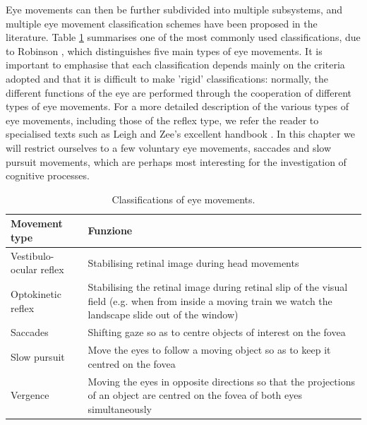 \documentclass[11pt]{article}
\begin{document}
Eye movements can then be further subdivided into multiple subsystems, and multiple eye movement classification schemes have been proposed in the literature. Table \ref{tab1} summarises one of the most commonly used classifications, due to Robinson \cite{Robinson1968}, which distinguishes five main types of eye movements. It is important to emphasise that each classification depends mainly on the criteria adopted and that it is difficult to make 'rigid' classifications: normally, the different functions of the eye are performed through the cooperation of different types of eye movements. For a more detailed description of the various types of eye movements, including those of the reflex type, we refer the reader to specialised texts such as Leigh and Zee's excellent handbook \cite{Leigh2015}. In this chapter we will restrict ourselves to a few voluntary eye movements, saccades and slow pursuit movements, which are perhaps most interesting for the investigation of cognitive processes.

\begin{table}
\centering
\caption{Classifications of eye movements.} \label{tab1}
\begin{tabular}{p{5.3cm}p{8cm}}
  \hline
\textbf{Movement type}  & \textbf{Funzione}\\
  \hline  \hline
Vestibulo-ocular reflex & Stabilising retinal image during head movements \\  \hline
 Optokinetic reflex & Stabilising the retinal image during retinal slip of the visual field (e.g. when from inside a moving train we watch the landscape slide out of the window)  \\  \hline
  Saccades & Shifting gaze so as to centre objects of interest on the fovea  \\  \hline
  Slow pursuit & Move the eyes to follow a moving object so as to keep it centred on the fovea  \\  \hline
 Vergence & Moving the eyes in opposite directions so that the projections of an object are centred on the fovea of both eyes simultaneously \\  \hline
   \hline
\end{tabular}
\end{table}
\end{document}

